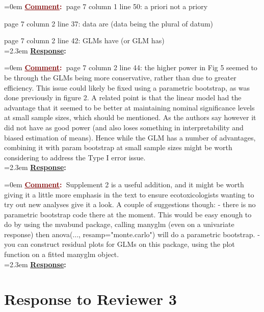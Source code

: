 \documentclass[12pt]{article}
\newcommand{\comment}[0]{\vspace{1em} \noindent \hangindent=0em \textbf{\textcolor{Maroon}{\uline{Comment}:~}}}
\newcommand{\response}[0]{\\\vspace{0.1em} \hangindent=2.3em \textbf{\textcolor{NavyBlue}{\uline{Response}:~}}}
\begin{document}
\comment page 7 column 1 line 50: a priori not a priory

page 7 column 2 line 37: data are (data being the plural of datum)

page 7 column 2 line 42: GLMs have (or GLM has)
\response

\comment page 7 column 2 line 44: the higher power in Fig 5 seemed to be through the GLMs being more conservative, rather than due to greater efficiency.  This issue could likely be fixed using a parametric bootstrap, as was done previously in figure 2.
A related point is that the linear model had the advantage that it seemed to be better at maintaining nominal significance levels at small sample sizes, which should be mentioned.  As the authors say however it did not have as good power (and also loses something in interpretability and biased estimation of means).  Hence while the GLM has a number of advantages, combining it with param bootstrap at small sample sizes might be worth considering to address the Type I error issue.
\response

\comment Supplement 2 is a useful addition, and it might be worth giving it a little more emphasis in the text to ensure ecotoxicologists wanting to try out new analyses give it a look.  A couple of suggestions though:
- there is no parametric bootstrap code there at the moment.  This would be easy enough to do by using the mvabund package, calling manyglm (even on a univariate response) then anova(..., resamp="monte.carlo")  will do a parametric bootstrap.
- you can construct residual plots for GLMs on this package, using the plot function on a fitted manyglm object.
\response


\section{Response to Reviewer 3}
\end{document}
